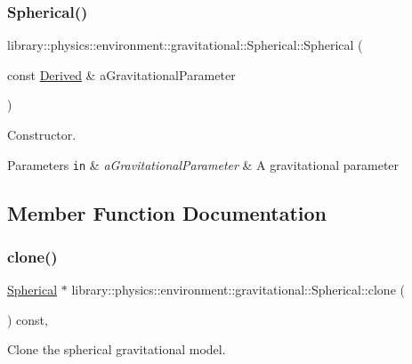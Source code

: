 \subsubsection{\texorpdfstring{Spherical()}{Spherical()}}
{\footnotesize\ttfamily library\+::physics\+::environment\+::gravitational\+::\+Spherical\+::\+Spherical (\begin{DoxyParamCaption}\item[{const \hyperlink{classlibrary_1_1physics_1_1units_1_1_derived}{Derived} \&}]{a\+Gravitational\+Parameter }\end{DoxyParamCaption})}



Constructor. 


\begin{DoxyParams}[1]{Parameters}
\mbox{\tt in}  & {\em a\+Gravitational\+Parameter} & A gravitational parameter \\
\hline
\end{DoxyParams}


\subsection{Member Function Documentation}
\mbox{\label{classlibrary_1_1physics_1_1environment_1_1gravitational_1_1_spherical_a4f27273f7e9897e9d67607a8b7b0bca7}} 
\subsubsection{\texorpdfstring{clone()}{clone()}}
{\footnotesize\ttfamily \hyperlink{classlibrary_1_1physics_1_1environment_1_1gravitational_1_1_spherical}{Spherical} $\ast$ library\+::physics\+::environment\+::gravitational\+::\+Spherical\+::clone (\begin{DoxyParamCaption}{ }\end{DoxyParamCaption}) const\hspace{0.3cm}{\ttfamily [override]}, {\ttfamily [virtual]}}



Clone the spherical gravitational model. 

